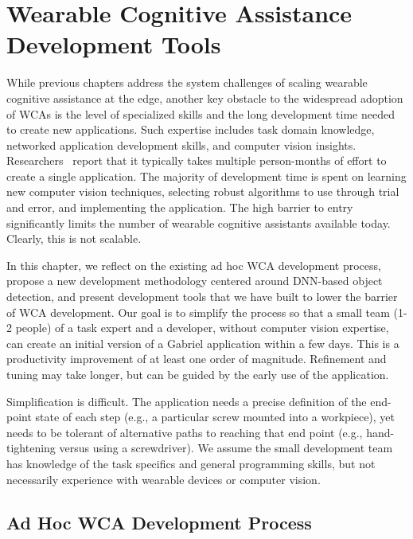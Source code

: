 \chapter{Wearable Cognitive Assistance Development Tools}
\label{chapter: app-dev}

While previous chapters address the system challenges of scaling wearable
cognitive assistance at the edge, another key obstacle to the widespread
adoption of WCAs is the level of specialized skills and the long development
time needed to create new applications. Such expertise includes task domain
knowledge, networked application development skills, and computer vision
insights. Researchers~\cite{chen2018application} report that it typically takes
multiple person-months of effort to create a single application. The majority of
development time is spent on learning new computer vision techniques, selecting
robust algorithms to use through trial and error, and implementing the
application. The high barrier to entry significantly limits the number of
wearable cognitive assistants available today. Clearly, this is not scalable. 

In this chapter, we reflect on the existing ad hoc WCA development process,
propose a new development methodology centered around DNN-based object
detection, and present development tools that we have built to lower the barrier
of WCA development. Our goal is to simplify the process so that a small team
(1-2 people) of a task expert and a developer, without computer vision
expertise, can create an initial version of a Gabriel application within a few
days. This is a productivity improvement of at least one order of magnitude.
Refinement and tuning may take longer, but can be guided by the early use of the
application. 

Simplification is difficult. The application needs a precise definition of the
end-point state of each step (e.g., a particular screw mounted into a
workpiece), yet needs to be tolerant of alternative paths to reaching that end
point (e.g., hand-tightening versus using a screwdriver). We assume the small
development team has knowledge of the task specifics and general programming
skills, but not necessarily experience with wearable devices or computer vision.

\section{Ad Hoc WCA Development Process}
\label{sec: app-dev-adhoc}

